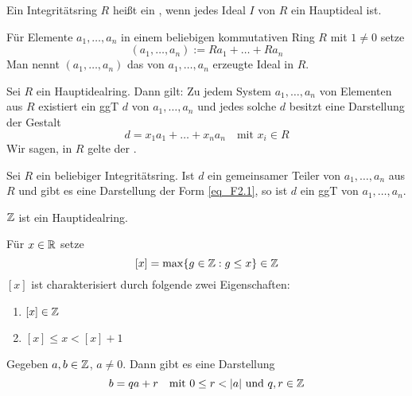 \begin{defn}[Hauptidealring] \label{def_2.2}
	Ein Integritätsring $R$ heißt ein , wenn jedes Ideal $I$ von $R$ ein Hauptideal ist.
\end{defn}

	Für Elemente $a_1,\dots,a_n$ in einem beliebigen kommutativen Ring $R$ mit $1 \neq 0$ setze
	\[ (a_1,\dots,a_n) := Ra_1 + \dots + Ra_n \]
	Man nennt $(a_1,\dots,a_n)$ das von $a_1,\dots,a_n$ erzeugte Ideal in $R$.
	
\begin{falko} \label{F2.1}
	Sei $R$ ein Hauptidealring. Dann gilt: Zu jedem System $a_1,\dots,a_n$ von Elementen aus $R$ existiert ein ggT $d$ von $a_1,\dots,a_n$ und jedes solche $d$ besitzt eine Darstellung der Gestalt
	\begin{equation}
		d = x_1a_1+\dots+x_na_n \quad \text{mit } x_i \in R \label{eq_F2.1}
	\end{equation}
	Wir sagen, in $R$ gelte der .
\end{falko}

	Sei $R$ ein beliebiger Integritätsring. Ist $d$ ein gemeinsamer Teiler von $a_1,\dots,a_n$ aus $R$ und gibt es eine Darstellung der Form \eqref{eq_F2.1}, so ist $d$ ein ggT von $a_1,\dots,a_n$.

\begin{satz} \label{satz_2.1}
	$\mathbb{Z}$ ist ein Hauptidealring.
\end{satz}

	Für $x \in \mathbb{R}$ setze
	\[ [x] = \max \{g \in \mathbb{Z} : g \leq x\} \in \mathbb{Z} \]
	$[x]$ ist charakterisiert durch folgende zwei Eigenschaften: \begin{enumerate}[(1)]
		\item $[x] \in \mathbb{Z}$
		\item $[x] \leq x < [x] + 1$
	\end{enumerate}

\begin{falko} \label{F2.2}
	Gegeben $a, b \in \mathbb{Z}$, $a \neq 0$. Dann gibt es eine Darstellung
	\begin{equation}
		b = qa +r \quad \text{mit } 0 \leq r < |a| \text{ und } q,r \in \mathbb{Z} \label{eq_F2.2}
	\end{equation}
\end{falko}

